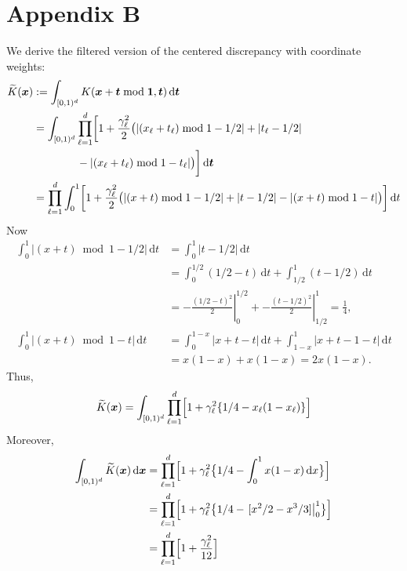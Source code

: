 \documentclass{svproc}
\begin{document}
\section*{Appendix B}
We derive the filtered version of the centered discrepancy with coordinate weights:
\begin{align*}
    \widetilde{K}({\boldsymbol{x}})
    &: = \int_{[0,1)^d} K({\boldsymbol{x}} + {\boldsymbol{t}} \bmod {\boldsymbol{1}}, {\boldsymbol{t}}) \, \mathrm{d} {\boldsymbol{t}} \\
    & = \int_{[0,1)^d} \prod_{\ell = 1}^d \biggl [ 1 + \frac {\gamma_\ell^2}2 \bigl ( \lvert (x_\ell + t_\ell) \bmod 1 - 1/2 \rvert + \lvert t_\ell - 1/2 \rvert   \\
    & \qquad \qquad  - \lvert (x_\ell + t_\ell) \bmod 1 - t_\ell \rvert \bigr ) \biggr] \, \mathrm{d} {\boldsymbol{t}} \\
    & = \prod_{\ell = 1}^d \int_0^1 \biggl [ 1 + \frac {\gamma_\ell^2}2 \bigl ( \lvert (x + t) \bmod 1 - 1/2 \rvert + \lvert t - 1/2 \rvert - \lvert (x + t) \bmod 1 - t \rvert \bigr ) \biggr] \, \mathrm{d} t
\end{align*}
Now
\begin{align*}
   \int_0^1   \lvert (x + t) \bmod 1 - 1/2 \rvert  \, \mathrm{d} t & =  \int_0^1   \lvert t - 1/2 \rvert  \, \mathrm{d} t \\
   & = \int_0^{1/2} (1/2-t) \, \mathrm{d} t + \int_{1/2}^1 (t - 1/2) \, \mathrm{d} t \\
   & = \left. - \frac{(1/2-t)^2}{2} \right \rvert_0^{1/2} + \left . - \frac{(t-1/2)^2}{2} \right \rvert _{1/2}^1 = \frac 14, \\
   \int_0^1   \lvert (x + t) \bmod 1 - t \rvert  \, \mathrm{d} t & =
   \int_0^{1-x} \lvert x+t - t \rvert \, \mathrm{d} t + \int_{1-x}^1 \lvert x+t -1 - t \rvert \, \mathrm{d} t \\
   & = x(1-x) + x(1-x) = 2x(1-x).
\end{align*}
Thus, 
\begin{equation}
    \widetilde{K}({\boldsymbol{x}}) = \int_{[0,1)^d} \prod_{\ell = 1}^d \Bigl [ 1 + \gamma_\ell^2 \{ 1/4 - x_\ell (1-x_\ell ) \} \Bigr]
\end{equation}
Moreover,
\begin{align*}
    \int_{[0,1)^d} \widetilde{K}({\boldsymbol{x}}) \, \mathrm{d} {\boldsymbol{x}} & =
    \prod_{\ell = 1}^d \Bigl [ 1 + \gamma_\ell^2  \bigl\{ 1/4 - \int_0^1 x (1-x ) \, \mathrm{d}x \bigr\} \Bigr] \\
    & = \prod_{\ell = 1}^d \Bigl [ 1 + \gamma_\ell^2 \bigl \{ 1/4 - \left . [x^2/2 - x^3 / 3] \right \rvert_0^1  \bigr \} \Bigr ]    \\
    & = \prod_{\ell = 1}^d \Bigl [ 1 + \frac{\gamma_\ell^2}{12} \Bigr ]
\end{align*}
\end{document}
